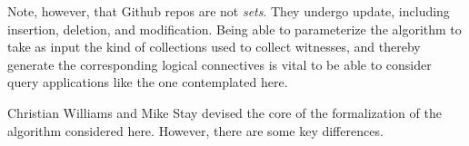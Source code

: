 Note, however, that Github repos are not \emph{sets}. They undergo
update, including insertion, deletion, and modification. Being able to
parameterize the algorithm to take as input the kind of collections
used to collect witnesses, and thereby generate the corresponding
logical connectives is vital to be able to consider query applications
like the one contemplated here.

Christian Williams and Mike Stay devised the core of the formalization
of the algorithm considered here. However, there are some key
differences.



